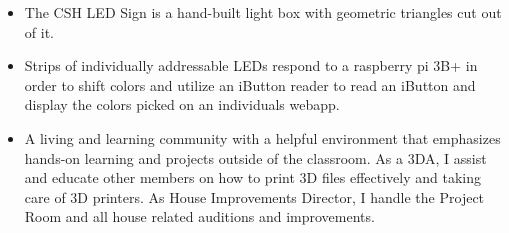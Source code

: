 \documentclass[10pt,a4paper]{altacv}
\begin{document}

\begin{itemize}
  \item The CSH LED Sign is a hand-built light box with geometric triangles cut out of it. 
  \item Strips of individually addressable LEDs respond to a raspberry pi 3B+ in order to shift colors and utilize an iButton reader to read an iButton and display the colors picked on an individuals webapp.

\end{itemize}

%












\begin{itemize}
	\item A living and learning community with a helpful environment that emphasizes hands-on learning and projects outside of the classroom. As a 3DA, I assist and educate other members on how to print 3D files effectively and taking care of 3D printers. As House Improvements Director, I handle the Project Room and all house related auditions and improvements.
\end{itemize}
\end{document}
